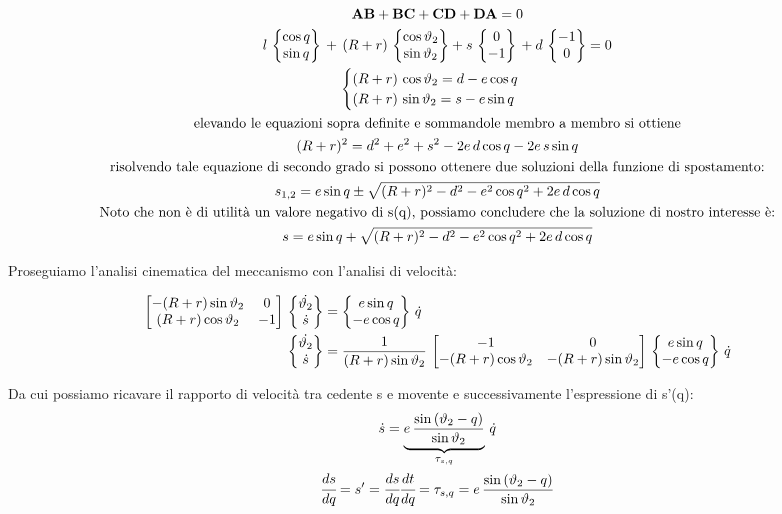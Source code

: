 				\begin{gather*}
				\mathbf{AB} +\mathbf{BC} + \mathbf{CD} + \mathbf{DA}=0\\
				l\,\begin{Bmatrix}\cos{q}\\\sin{q}\end{Bmatrix}\,+\,(R+r)\,\begin{Bmatrix}\cos{\vartheta_2}\\\sin{\vartheta_2}\end{Bmatrix} + s\,\begin{Bmatrix}0\\-1\end{Bmatrix}\,+d\,\begin{Bmatrix}-1\\0\end{Bmatrix}=0\\
				\begin{cases}
				(R+r)\,\cos{\vartheta_2} = d-e\cos{q}\\
				(R+r)\,\sin{\vartheta_2} = s - e \sin{q}
				\end{cases}\\
				\text{elevando le equazioni sopra definite e sommandole membro a membro si ottiene}\\
				(R+r)^2	 = d^2 + e^2 + s^2 -2e\,d\cos{q} -2e\,s\sin{q}\\
				\text{risolvendo tale equazione di secondo grado si possono ottenere due soluzioni della funzione di spostamento:}\\
				s_{1,2} = e\sin{q} \pm \sqrt{(R+r)^2 - d^2 - e^2\cos{q}^2 + 2e\,d\cos{q}}\\
				\text{Noto che non è di utilità un valore negativo di s(q), possiamo concludere che la soluzione di nostro interesse è:}\\
				s = e\sin{q} + \sqrt{(R+r)^2 - d^2 - e^2\cos{q}^2 + 2e\,d\cos{q}}\\
				\end{gather*}
		
		Proseguiamo l'analisi cinematica del meccanismo con l'analisi di velocità:
		
		\begin{align*}
		\begin{bmatrix}-(R+r)\sin{\vartheta_2}&0\\(R+r)\cos{\vartheta_2}&-1\end{bmatrix}\,\begin{Bmatrix}\dot{\vartheta_2}\\\dot{s}\end{Bmatrix} &= \begin{Bmatrix}e\sin{q}\\-e\cos{q}\end{Bmatrix}\,\dot{q}\\
		\begin{Bmatrix}\dot{\vartheta_2}\\\dot{s}\end{Bmatrix} &= \frac{1}{(R+r)\sin{\vartheta_2}}\,\begin{bmatrix}-1&0\\-(R+r)\cos{\vartheta_2}&-(R+r)\sin{\vartheta_2}\end{bmatrix}\,\begin{Bmatrix}e\sin{q}\\-e\cos{q}\end{Bmatrix}\,\dot{q}
		\end{align*}
		
		Da cui possiamo ricavare il rapporto di velocità tra cedente s e movente e successivamente l'espressione di s'(q):
		\begin{gather*}
		\dot{s} = \underbrace{e\,\frac{\sin{(\vartheta_2 - q)}}{\sin{\vartheta_2}}}_{\tau_{s,q}}\,\dot{q}\\
		\cfrac{ds}{dq} = s' = \cfrac{ds}{dq} \cfrac{dt}{dq} = \tau_{s,q} = e\,\frac{\sin{(\vartheta_2 - q)}}{\sin{\vartheta_2}}
		\end{gather*}
		
